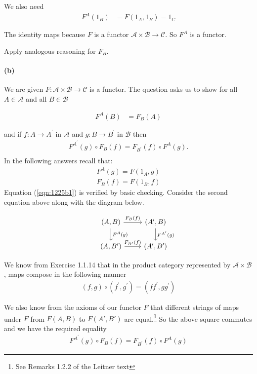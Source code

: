 \documentclass{article}
\begin{document}
We also need
\begin{align*}
F^A(1_B) &= F(1_A, 1_B) = 1_C
\end{align*}

The identity maps because $F$ is a functor $\mathcal{A} \times \mathcal{B} \rightarrow \mathcal{C}$. So $F^A$ is a functor.

Apply analogous reasoning for $F_B$.
\paragraph{(b)}

We are given $F: \mathcal{A} \times \mathcal{B} \rightarrow \mathcal{C}$ is a functor.
The question asks us to show for all $A \in \mathcal{A}$ and all $B \in \mathcal{B}$

\begin{align}
\label{eqn:1225b1}
  F^A(B) &= F_B(A)
\end{align}

and if $f: A \rightarrow A^{\prime}$ in $\mathcal{A}$ and $g: B \rightarrow B^\prime$ in
$\mathcal{B}$ then
\begin{align*}
F^{A^{\prime}}(g) \circ F_B(f) = F_{B^\prime}(f) \circ F^A(g). \\
\end{align*}
In the following answers recall that:
\begin{align*}
  F^A(g) = F(1_A, g) \\
  F_B(f) = F(1_B, f)
\end{align*}
Equation (\ref{eqn:1225b1}) is verified by basic checking. Consider the second equation above along with the diagram below.

\begin{equation}
\label{eqn:1225b2}
\begin{tikzcd}
  & (A,B) \arrow[d,"F^A(g)"] \arrow[r, "F_B(f)"] & (A',B) \arrow[d,"F^{A^{\prime}}(g)"{name=G,right}]\\
  & (A,B') \arrow[r,"F_{B^{\prime}}(f)"] & (A',B')
\end{tikzcd}
\end{equation}

We know from Exercise 1.1.14 that in the product category represented by $\mathcal{A} \times \mathcal{B}$, maps compose in the following manner
\begin{align*}
  (f, g) \circ (f^{\prime},g^{\prime}) = (ff^{\prime}, gg^{\prime})
\end {align*}

We also know from the axioms of our functor $F$ that different strings of maps under $F$ from $F(A,B)$ to $F(A',B')$ are equal.\footnote{See Remarks 1.2.2 of the Leitner text} So the above square commutes and we have the required equality
\begin{align*}
  F^{A^{\prime}}(g) \circ F_B(f) = F_{B^\prime}(f) \circ F^A(g)
\end{align*}
\end{document}
